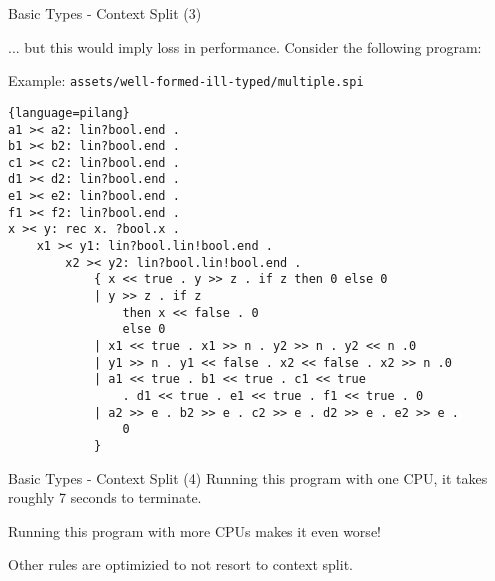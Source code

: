 \begin{frame}[fragile]{Basic Types - Context Split (3)}
    
    ... but this would imply loss in performance. Consider the following program:
    \begin{exampleblock}{Example: \texttt{assets/well-formed-ill-typed/multiple.spi}}
\tiny\begin{lstlisting}{language=pilang}
a1 >< a2: lin?bool.end .
b1 >< b2: lin?bool.end .
c1 >< c2: lin?bool.end .
d1 >< d2: lin?bool.end .
e1 >< e2: lin?bool.end .
f1 >< f2: lin?bool.end .
x >< y: rec x. ?bool.x .
    x1 >< y1: lin?bool.lin!bool.end .
        x2 >< y2: lin?bool.lin!bool.end .
            { x << true . y >> z . if z then 0 else 0
            | y >> z . if z
                then x << false . 0
                else 0
            | x1 << true . x1 >> n . y2 >> n . y2 << n .0
            | y1 >> n . y1 << false . x2 << false . x2 >> n .0
            | a1 << true . b1 << true . c1 << true 
                . d1 << true . e1 << true . f1 << true . 0
            | a2 >> e . b2 >> e . c2 >> e . d2 >> e . e2 >> e . 
                0
            }
        \end{lstlisting}
    \end{exampleblock}
\end{frame}

\begin{frame}{Basic Types - Context Split (4)}
    Running this program with one CPU, it takes roughly 7 seconds to terminate.
    \vspace{0.5cm}

    Running this program with more CPUs makes it even worse!

    \vspace{0.5cm}

    Other rules are optimizied to not resort to context split.
\end{frame}

